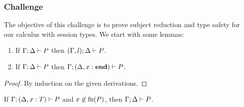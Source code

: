 \subsubsection{Challenge}
The objective of this challenge is to prove subject reduction and type safety for our calculus with session types. We start with some lemmas:

\begin{lemma}[Weakening]\mbox{}
  \label{lemma:weak}
  \begin{enumerate}
  \item If \( \Gamma; \Delta \vdash P \) then
    \( (\Gamma, l);\Delta \vdash P \).
  \item If \( \Gamma; \Delta \vdash P \) %
    then
    \( \Gamma;(\Delta, x : \mathbf{end}) \vdash P \).
  \end{enumerate}
\end{lemma}
\begin{proof}
  By induction on the given derivations.
\end{proof}
\begin{lemma}[Strengthening]\mbox{}
  \label{lemma:strenD}
  If \( \Gamma; (\Delta, x : T) \vdash P \) and
  $x\not\in \textrm{fn}(P)$, then \( \Gamma; \Delta \vdash P \).
\end{lemma}
